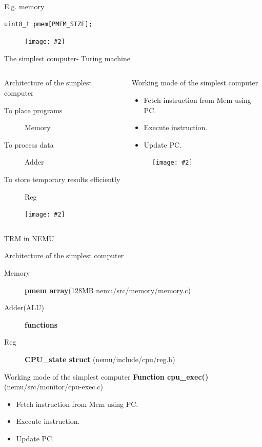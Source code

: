 \documentclass{beamer}
\newcommand{\fignocaption}[2]{
	\begin{figure}[htp]
		\centering
		\texttt{[image: \#2]}
	\end{figure}
}
\begin{document}
\begin{frame}[fragile]{E.g. memory}
\begin{verbatim}
uint8_t pmem[PMEM_SIZE];
\end{verbatim}
	\fignocaption{scale=0.2}{memory.jpg}
\end{frame}

\begin{frame}{The simplest computer- Turing machine}
	\begin{columns}
		\begin{column}{0.5\textwidth}
			\begin{block}{Architecture of the simplest computer }
					\begin{description}
					\item[To place programs] Memory
					\item[To process data]Adder
					\item[To store temporary results efficiently]Reg
				\end{description}
			\end{block}
			\fignocaption{scale=0.4}{trm.png}
		
		\end{column}
		\begin{column}{0.5\textwidth}
				\begin{block}{Working mode of the simplest computer}
				\begin{itemize}
					\item Fetch instruction from Mem using PC.
					\item Execute instruction.
					\item Update PC.
				\end{itemize}
			\end{block}
			\fignocaption{scale=0.5}{tapemachine.jpg}
	\end{column}
	\end{columns}
\end{frame}


\begin{frame}{TRM in NEMU}
		\begin{block}{Architecture of the simplest computer }
			\begin{description}
				\item[Memory] \textbf{pmem array}(128MB nemu/src/memory/memory.c)
				\item[Adder(ALU)] \textbf{functions} 
				\item[Reg]	\textbf{CPU\_state struct} (nemu/include/cpu/reg.h)
			\end{description}
		\end{block}
		\begin{block}{Working mode of the simplest computer}
			\textbf{Function cpu\_exec() }(nemu/src/monitor/cpu-exec.c)
			\begin{itemize}
				\item Fetch instruction from Mem using PC.
				\item Execute instruction.
				\item Update PC.
			\end{itemize}
		\end{block}
\end{frame}
\end{document}
